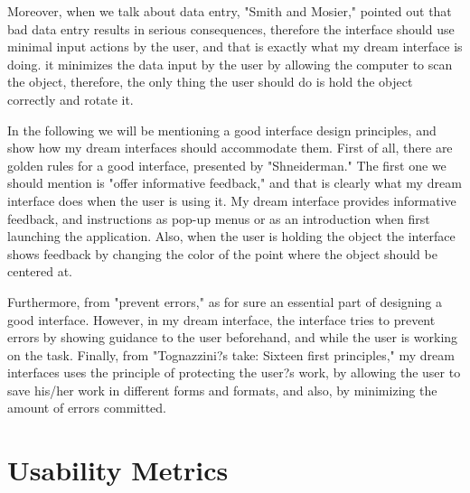 \documentclass[12pt, oneside]{amsart}   	%
\begin{document}
Moreover, when we talk about data entry, "Smith and Mosier," pointed out that bad data entry results in serious consequences, therefore the interface should use minimal input actions by the user, and that is exactly what my dream interface is doing. it minimizes the data input by the user by allowing the computer to scan the object, therefore, the only thing the user should do is hold the object correctly and rotate it. 

In the following we will be mentioning a good interface design principles, and show how my dream interfaces should accommodate them.  First of all, there are golden rules for a good interface, presented by "Shneiderman."  The first one we should mention is "offer informative feedback," and that is clearly what my dream interface does when the user is using it.  My dream interface provides informative feedback, and instructions as pop-up menus or as an introduction when first launching the application.  Also, when the user is holding the object the interface shows feedback by changing the color of the point where the object should be centered at. 

Furthermore, from "prevent errors," as for sure an essential part of designing a good interface.  However, in my dream interface, the interface tries to prevent errors by showing guidance to the user beforehand, and while the user is working on the task.  Finally, from "Tognazzini?s take: Sixteen first principles," my dream interfaces uses the principle of protecting the user?s work, by allowing the user to save his/her work in different forms and formats, and also, by minimizing the amount of errors committed.

\section{Usability Metrics}
\end{document}
